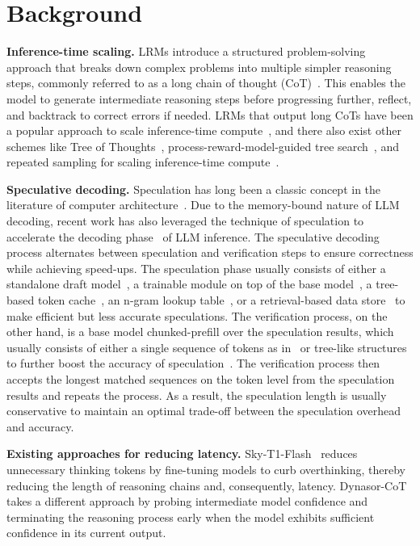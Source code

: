 \section{Background}

\textbf{Inference-time scaling.} LRMs introduce a structured problem-solving approach that breaks down complex problems into multiple simpler reasoning steps, commonly referred to as a long chain of thought (CoT)~\citep{cot}. This enables the model to generate intermediate reasoning steps before progressing further, reflect, and backtrack to correct errors if needed. LRMs that output long CoTs have been a popular approach to scale inference-time compute~\citep{deepseek_r1,openai_o1,openai_o3}, and there also exist other schemes like Tree of Thoughts~\citep{tot}, process-reward-model-guided tree search~\citep{prm,rstar,rstar_math}, and repeated sampling for scaling inference-time compute~\citep{large_language_monkeys}.



\textbf{Speculative decoding.} Speculation has long been a classic concept in the literature of computer architecture~\citep{burton1985speculative}. Due to the memory-bound nature of LLM decoding, recent work has also leveraged the technique of speculation to accelerate the decoding phase~\citep{stern2018blockwise, spec_decoding, decoding_specdecoding} of LLM inference. The speculative decoding process alternates between speculation and verification steps to ensure correctness while achieving speed-ups. The speculation phase usually consists of either a standalone draft model~\citep{spec_decoding, specinfer}, a trainable module on top of the base model~\citep{medusa, eagle}, a tree-based token cache~\citep{suffix_decoding, token_recycling, lookahead_alipay}, an n-gram lookup table~\citep{lookahead}, or a retrieval-based data store~\citep{rest} to make efficient but less accurate speculations. The verification process, on the other hand, is a base model chunked-prefill over the speculation results, which usually consists of either a single sequence of tokens as in~\citet{spec_decoding} or tree-like structures to further boost the accuracy of speculation~\citep{specinfer, medusa, eagle, sequoia}. The verification process then accepts the longest matched sequences on the token level from the speculation results and repeats the process. As a result, the speculation length is usually conservative to maintain an optimal trade-off between the speculation overhead and accuracy. 

\textbf{Existing approaches for reducing latency.} Sky-T1-Flash~\cite{sky_t1_flash} reduces unnecessary thinking tokens by fine-tuning models to curb overthinking, thereby reducing the length of reasoning chains and, consequently, latency. Dynasor-CoT~\cite{certaindex,dynasor_cot} takes a different approach by probing intermediate model confidence and terminating the reasoning process early when the model exhibits sufficient confidence in its current output.




